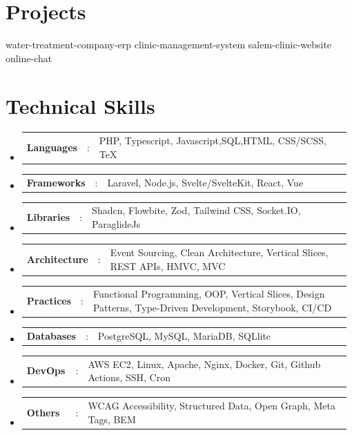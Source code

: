 \documentclass[a4paper,11pt]{article}
\newcommand{\resumeItem}[1]{
  \item\small{#1}
}
\newcommand{\resumeItemListStart}{\begin{itemize}[rightmargin=0.11in]}
\newcommand{\resumeItemListEnd}{\end{itemize}}
\newcommand{\resumeSectionType}[3]{
  \item\begin{tabular*}{0.96\textwidth}[t]{
    p{0.15\linewidth}p{0.02\linewidth}p{0.81\linewidth}
  }
    \textbf{#1} & #2 & #3
  \end{tabular*}\vspace{-2pt}
}
\newcommand{\resumeHeadingListStart}{
  \begin{itemize}[leftmargin=0.15in, label={}]
}
\newcommand{\resumeHeadingListEnd}{\end{itemize}}
\begin{document}

\section{Projects}
  \resumeHeadingListStart{}
    {water-treatment-company-erp}
    {clinic-management-system}
    {salem-clinic-website}
    {online-chat}
  \resumeHeadingListEnd{}


\section{Technical Skills}
  \resumeHeadingListStart{}
    \resumeSectionType{Languages}{:}{PHP, Typescript, Javascript,SQL,HTML, CSS/SCSS, TeX}
    \resumeSectionType{Frameworks}{:}{Laravel, Node.js, Svelte/SvelteKit, React, Vue}
    \resumeSectionType{Libraries}{:}{Shadcn, Flowbite, Zod, Tailwind CSS, Socket.IO, ParaglideJs}
    \resumeSectionType{Architecture}{:}{Event Sourcing, Clean Architecture, Vertical Slices, REST APIs, HMVC, MVC}
    \resumeSectionType{Practices}{:}{Functional Programming, OOP, Vertical Slices, Design Patterns, Type-Driven Development, Storybook, CI/CD}
    \resumeSectionType{Databases}{:}{PostgreSQL, MySQL, MariaDB, SQLlite}
    \resumeSectionType{DevOps}{:}{AWS EC2, Linux, Apache, Nginx, Docker, Git, Github Actions, SSH, Cron}
    \resumeSectionType{Others}{:}{WCAG Accessibility, Structured Data, Open Graph, Meta Tags, BEM}
  \resumeHeadingListEnd{}


\end{document}
